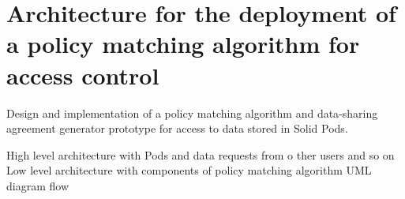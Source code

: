 \section{Architecture for the deployment of a policy matching algorithm for access control}
\label{sec:architecture}

Design and implementation of a policy matching algorithm and data-sharing agreement generator prototype for access to data stored in Solid Pods.

High level architecture with Pods and data requests from o ther users and so on
Low level architecture with components of policy matching algorithm
UML diagram flow